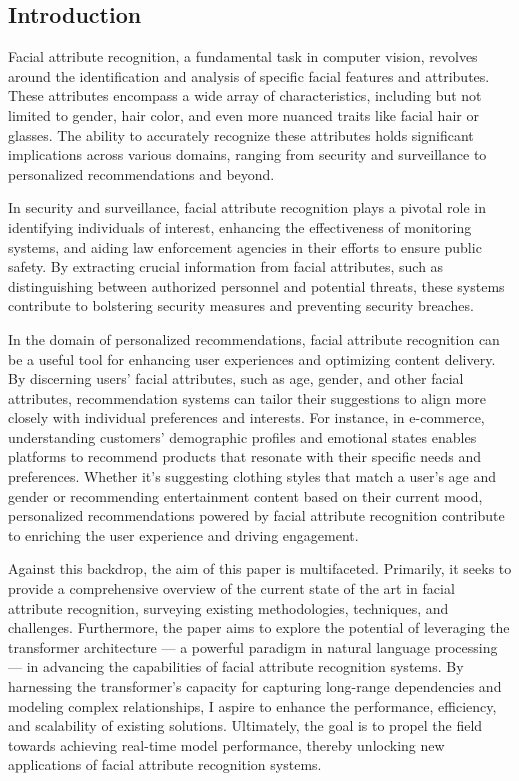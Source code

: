 \documentclass[a4paper,oneside]{article}
\begin{document}
\subsection{Introduction}
\label{sec:introduction}

Facial attribute recognition, a fundamental task in computer vision, revolves around the identification and analysis of specific facial features and attributes.
These attributes encompass a wide array of characteristics, including but not limited to gender, hair color, and even more nuanced traits like facial hair or glasses.
The ability to accurately recognize these attributes holds significant implications across various domains, ranging from security and surveillance to personalized recommendations and beyond.

In security and surveillance, facial attribute recognition plays a pivotal role in identifying individuals of interest, enhancing the effectiveness of monitoring systems, and aiding law enforcement agencies in their efforts to ensure public safety.
By extracting crucial information from facial attributes, such as distinguishing between authorized personnel and potential threats, these systems contribute to bolstering security measures and preventing security breaches.

In the domain of personalized recommendations, facial attribute recognition can be a useful tool for enhancing user experiences and optimizing content delivery. By discerning users' facial attributes, such as age, gender, and other facial attributes, recommendation systems can tailor their suggestions to align more closely with individual preferences and interests.
For instance, in e-commerce, understanding customers' demographic profiles and emotional states enables platforms to recommend products that resonate with their specific needs and preferences. Whether it's suggesting clothing styles that match a user's age and gender or recommending entertainment content based on their current mood, personalized recommendations powered by facial attribute recognition contribute to enriching the user experience and driving engagement.

Against this backdrop, the aim of this paper is multifaceted. Primarily, it seeks to provide a comprehensive overview of the current state of the art in facial attribute recognition, surveying existing methodologies, techniques, and challenges. Furthermore, the paper aims to explore the potential of leveraging the transformer architecture — a powerful paradigm in natural language processing — in advancing the capabilities of facial attribute recognition systems. By harnessing the transformer's capacity for capturing long-range dependencies and modeling complex relationships, I aspire to enhance the performance, efficiency, and scalability of existing solutions.
Ultimately, the goal is to propel the field towards achieving real-time model performance, thereby unlocking new applications of facial attribute recognition systems.
\end{document}
